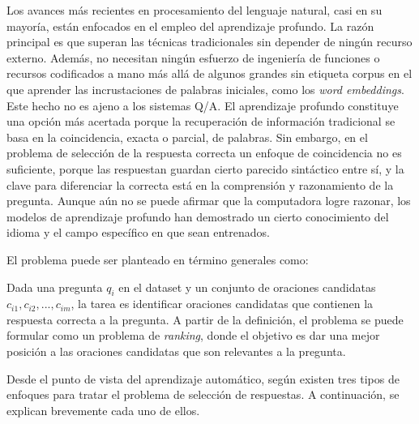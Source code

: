 Los avances más recientes en procesamiento del lenguaje natural, casi en su mayoría, están enfocados en el empleo del aprendizaje profundo. La razón principal es que superan las técnicas tradicionales sin depender de ningún recurso externo. Además, no necesitan ningún esfuerzo de ingeniería de funciones o recursos codificados a mano más allá de algunos grandes sin etiqueta corpus en el que aprender las incrustaciones de palabras iniciales, como los \textit{word embeddings}. Este hecho no es ajeno a los sistemas Q/A. El aprendizaje profundo constituye una opción más acertada porque la recuperación de información tradicional se basa en la coincidencia, exacta o parcial, de palabras. Sin embargo, en el problema de selección de la respuesta correcta un enfoque de coincidencia no es suficiente, porque las respuestan guardan cierto parecido sintáctico entre sí, y la clave para diferenciar la correcta está en la comprensión y razonamiento de la pregunta. Aunque aún no se puede afirmar que la computadora logre razonar, los modelos de aprendizaje profundo han demostrado un cierto conocimiento del idioma y el campo específico en que sean entrenados.

El problema puede ser planteado en término generales como: 

Dada una pregunta $q_{i}$ en el dataset y un conjunto de oraciones candidatas ${c_{i1}, c_{i2}, ..., c_{im}}$, la tarea es identificar oraciones candidatas que contienen
la respuesta correcta a la pregunta. A partir de la definición, el problema se puede formular como un problema de \textit{ranking}, donde el objetivo es dar una mejor posición a las oraciones candidatas que son relevantes a la pregunta.

Desde el punto de vista del aprendizaje automático, según \cite{2018-lai-review} existen tres tipos de enfoques para tratar el problema de selección de respuestas. A continuación, se explican brevemente cada uno de ellos.

